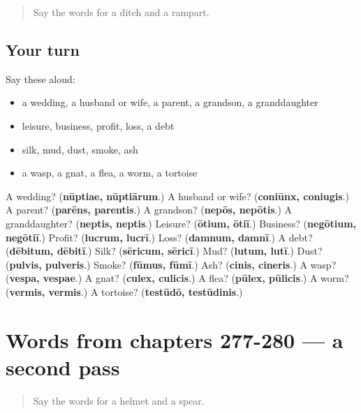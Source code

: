 \label{lesson:LA-R280-first-pass-words-from-chapters-273-276}



\begin{quote}
Say the words for a ditch and a rampart.
\end{quote}

\subsection*{Your turn}
Say these aloud:

\begin{itemize}
\raggedright
  \item a wedding, a husband or wife, a parent, a grandson, a granddaughter
  \item leisure, business, profit, loss, a debt
  \item silk, mud, dust, smoke, ash
  \item a wasp, a gnat, a flea, a worm, a tortoise
\end{itemize}

\begin{tcolorbox}[breakable,colback=teal!4,colframe=teal!35!black,title={Before you move on}]
A wedding? (\textbf{nūptiae, nūptiārum}.) A husband or wife? (\textbf{coniūnx, coniugis}.) A parent? (\textbf{parēns, parentis}.) A grandson? (\textbf{nepōs, nepōtis}.) A granddaughter? (\textbf{neptis, neptis}.) Leisure? (\textbf{ōtium, ōtiī}.) Business? (\textbf{negōtium, negōtiī}.) Profit? (\textbf{lucrum, lucrī}.) Loss? (\textbf{damnum, damnī}.) A debt? (\textbf{dēbitum, dēbitī}.) Silk? (\textbf{sēricum, sēricī}.) Mud? (\textbf{lutum, lutī}.) Dust? (\textbf{pulvis, pulveris}.) Smoke? (\textbf{fūmus, fūmī}.) Ash? (\textbf{cinis, cineris}.) A wasp? (\textbf{vespa, vespae}.) A gnat? (\textbf{culex, culicis}.) A flea? (\textbf{pūlex, pūlicis}.) A worm? (\textbf{vermis, vermis}.) A tortoise? (\textbf{testūdō, testūdinis}.)
\end{tcolorbox}
\section[(dialogue)]{Words from chapters 277-280 — a second pass}

\label{lesson:LA-R280-second-pass-words-from-chapters-277-280}



\begin{quote}
Say the words for a helmet and a spear.
\end{quote}

